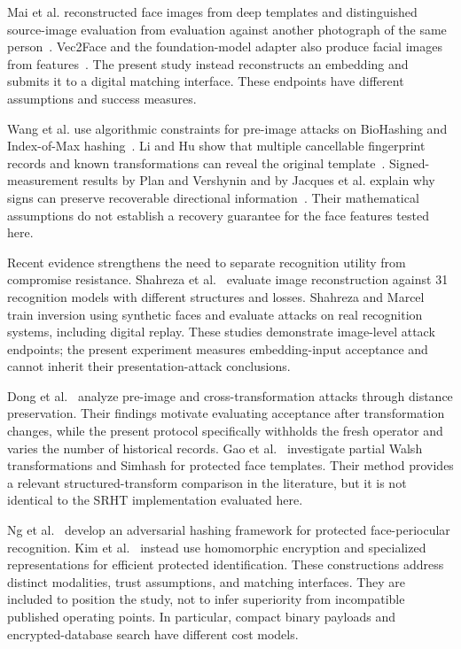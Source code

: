 Mai et al. reconstructed face images from deep templates and distinguished source-image evaluation from evaluation against another photograph of the same person~\cite{mai2019reconstruction}. Vec2Face and the foundation-model adapter also produce facial images from features~\cite{vec2face,shahreza2024adapter}. The present study instead reconstructs an embedding and submits it to a digital matching interface. These endpoints have different assumptions and success measures.

Wang et al. use algorithmic constraints for pre-image attacks on BioHashing and Index-of-Max hashing~\cite{wang2021csa}. Li and Hu show that multiple cancellable fingerprint records and known transformations can reveal the original template~\cite{li2014multiplicity}. Signed-measurement results by Plan and Vershynin and by Jacques et al. explain why signs can preserve recoverable directional information~\cite{plan2013,jacques2013}. Their mathematical assumptions do not establish a recovery guarantee for the face features tested here.


Recent evidence strengthens the need to separate recognition utility from compromise resistance. Shahreza et al.~\cite{shahreza2024vulnerability} evaluate image reconstruction against 31 recognition models with different structures and losses. Shahreza and Marcel~\cite{shahreza2024synthetic} train inversion using synthetic faces and evaluate attacks on real recognition systems, including digital replay. These studies demonstrate image-level attack endpoints; the present experiment measures embedding-input acceptance and cannot inherit their presentation-attack conclusions.

Dong et al.~\cite{dong2024risk} analyze pre-image and cross-transformation attacks through distance preservation. Their findings motivate evaluating acceptance after transformation changes, while the present protocol specifically withholds the fresh operator and varies the number of historical records. Gao et al.~\cite{gao2024walsh} investigate partial Walsh transformations and Simhash for protected face templates. Their method provides a relevant structured-transform comparison in the literature, but it is not identical to the SRHT implementation evaluated here.

Ng et al.~\cite{ng2025flexible} develop an adversarial hashing framework for protected face-periocular recognition. Kim et al.~\cite{kim2025idface} instead use homomorphic encryption and specialized representations for efficient protected identification. These constructions address distinct modalities, trust assumptions, and matching interfaces. They are included to position the study, not to infer superiority from incompatible published operating points. In particular, compact binary payloads and encrypted-database search have different cost models.


